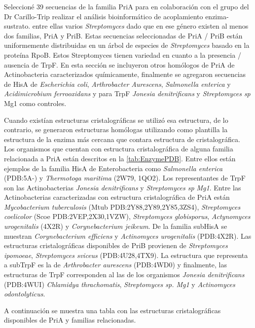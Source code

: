 \documentclass[12pt,twoside]{reedthesis}
\begin{document}
  Seleccioné 39 secuencias de la familia PriA para en colaboración con el
  grupo del Dr Carillo-Trip realizar el análisis bioinformático de
  acoplamiento enzima-sustrato. entre ellas varios \emph{Streptomyces}
  dado que en ese género existen al menos dos familias, PriA y PriB. Estas
  secuencias seleccionadas de PriA / PriB están uniformemente distribuidas
  en un árbol de especies de \emph{Streptomyces} basado en la proteína
  RpoB. Estos Streptomyces tienen variedad en cuanto a la presencia /
  ausencia de TrpF. En esta sección se incluyeron otros homólogos de PriA
  de Actinobacteria caracterizados químicamente, finalmente se agregaron
  secuencias de HisA de \emph{Escherichia coli}, \emph{Arthrobacter
  Aurescens}, \emph{Salmonella enterica} y \emph{Acidimicrobium
  ferrooxidans} y para TrpF \emph{Jonesia denitrificans} y
  \emph{Streptomyces sp } Mg1 como controles.
  
  Cuando existían estructuras cristalográficas se utilizó esa estructura,
  de lo contrario, se generaron estructuras homólogas utilizando como
  plantilla la estructura de la enzima más cercana que contara estructura
  de cristalográfica. Los organismos que cuentan con estructura
  cristalográfica de alguna familia relacionada a PriA están descritos en
  la \autoref{tab:EnzymePDB}. Entre ellos están ejemplos de la familia
  HisA de Enterobacteria como \emph{Salmonella enterica} (PDB:5A-) y
  \emph{Thermotoga maritima} (2W79, 1QO2). Los representantes de TrpF son
  las Actinobacterias \emph{Jonesia denitrificans} y \emph{Streptomyces sp
  Mg1}. Entre las Actinobacterias caracterizadas con estructura
  cristalográfica de PriA están \emph{Mycobacterium tuberculosis} (Mtub
  PDB:2Y88,2Y89,2Y85,3ZS4), \emph{Streptomyces coelicolor} (Scoe
  PDB:2VEP,2X30,1VZW), \emph{Streptomyces globisporus}, \emph{Actynomyces
  urogenitalis} (4X2R) y \emph{Corynebacterium jeikeum}. De la familia
  subHisA se muestran \emph{Corynebacterium efficiens} y \emph{Actinomyces
  urogenitalis} (PDB:4X2R). Las estructuras cristalográficas disponibles
  de PriB provienen de \emph{Streptomyces ipomoeae}, \emph{Streptomyces
  sviceus} (PDB:4U28,4TX9). La estructura que representa a subTrpF es la
  de \emph{Arthrobacter aurescens} (PDB:4WD0) y finalmente, las
  estructuras de TrpF corresponden al las de los organismos \emph{Jonesia
  denitrificans} (PDB:4WUI) \emph{Chlamidya thrachomatis},
  \emph{Streptomyces sp. Mg1} y \emph{Actinomyces odontolyticus}.
  
  A continuación se muestra una tabla con las estructuras cristalográficas
  disponibles de PriA y familias relacionadas.
  
\end{document}
